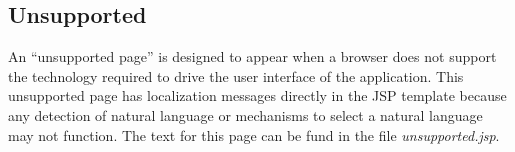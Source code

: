 \subsection{Unsupported}

An ``unsupported page'' is designed to appear when a browser does not support the technology required to drive the user interface of the application.  This unsupported page has localization messages directly in the JSP template because any detection of natural language or mechanisms to select a natural language may not function.  The text for this page can be fund in the file {\it unsupported.jsp}.